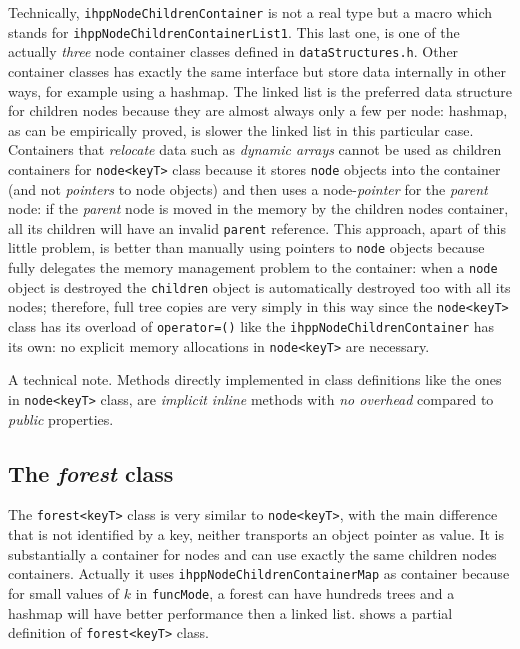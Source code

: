 \documentclass[a4paper,10pt]{report}
\begin{document}
\noindent
Technically, \verb|ihppNodeChildrenContainer| is not a real type but a macro which
stands for \verb|ihppNodeChildrenContainerList1|.
This last one, is one of the actually \emph{three} node container 
classes defined in \verb|dataStructures.h|. Other container classes
has exactly the same interface but store data internally in other ways,
for example using a hashmap. The linked list is the preferred data structure
for children nodes because they are almost always only a few per node: 
hashmap, as can be empirically proved, is slower the linked list 
in this particular case. Containers that \emph{relocate} data
such as \emph{dynamic arrays} cannot be used as children containers for \verb|node<keyT>|
class because it stores \verb|node| objects into the container (and not \emph{pointers} to node objects) and then uses a node-\emph{pointer} for the \emph{parent} node: 
if the \emph{parent} node is moved in the memory by the children nodes container,
all its children will have an invalid \verb|parent| reference. 
This approach, apart of this little problem, is better than manually using pointers 
to \verb|node| objects because fully delegates the memory management problem to the container: when a \verb|node| object is destroyed the \verb|children| object
is automatically destroyed too with all its nodes; therefore, full tree copies
are very simply in this way since the \verb|node<keyT>| class has its 
overload of \verb|operator=()| like the \verb|ihppNodeChildrenContainer| has its own:
no explicit memory allocations in \verb|node<keyT>| are necessary.

A technical note. Methods directly implemented in class definitions like
the ones in \verb|node<keyT>| class, are \emph{implicit inline} methods with
\emph{no overhead} compared to \emph{public} properties.

\subsection{The \emph{forest} class}

The \verb|forest<keyT>| class is very similar to \verb|node<keyT>|, with
the main difference that is not identified by a key, neither transports
an object pointer as value. It is substantially a container 
for nodes and can use exactly the same children nodes containers. Actually
it uses \verb|ihppNodeChildrenContainerMap| as container because for small values
of $k$ in \verb|funcMode|, a forest can have hundreds trees and a hashmap will have
better performance then a linked list. 
 shows a partial definition of \verb|forest<keyT>| class.
\end{document}

